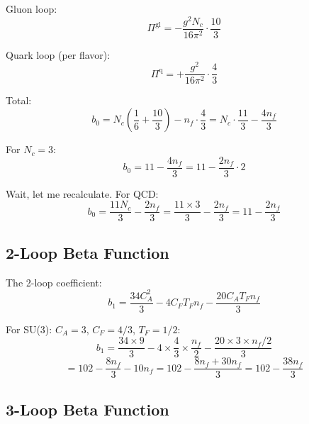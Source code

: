 \documentclass[11pt,a4paper]{article}
\theoremstyle{definition}
\begin{document}
Gluon loop:
\begin{equation}
\label{eq:gluon-contrib}
\Pi^{\text{gl}} = -\frac{g^2 N_c}{16\pi^2} \cdot \frac{10}{3}
\end{equation}

Quark loop (per flavor):
\begin{equation}
\label{eq:quark-contrib}
\Pi^{\text{q}} = +\frac{g^2}{16\pi^2} \cdot \frac{4}{3}
\end{equation}

Total:
\begin{equation}
\label{eq:total-beta-deriv}
b_0 = N_c\left(\frac{1}{6} + \frac{10}{3}\right) - n_f \cdot \frac{4}{3}
  = N_c \cdot \frac{11}{3} - \frac{4n_f}{3}
\end{equation}

For $N_c = 3$:
\begin{equation}
\label{eq:b0-nc3}
b_0 = 11 - \frac{4n_f}{3} = 11 - \frac{2n_f}{3} \cdot 2
\end{equation}

Wait, let me recalculate. For QCD:
\begin{equation}
\label{eq:b0-correct}
b_0 = \frac{11N_c}{3} - \frac{2n_f}{3} = \frac{11 \times 3}{3} - \frac{2n_f}{3} = 11 - \frac{2n_f}{3}
\end{equation}

\subsection{2-Loop Beta Function}
\label{subsec:2loop-beta-deriv}

The 2-loop coefficient:
\begin{equation}
\label{eq:b1-formula-app}
b_1 = \frac{34C_A^2}{3} - 4C_F T_F n_f - \frac{20C_A T_F n_f}{3}
\end{equation}

For SU(3): $C_A = 3$, $C_F = 4/3$, $T_F = 1/2$:
\begin{equation}
\label{eq:b1-su3-calc}
b_1 = \frac{34 \times 9}{3} - 4 \times \frac{4}{3} \times \frac{n_f}{2} - \frac{20 \times 3 \times n_f/2}{3}
\end{equation}
\begin{equation}
\label{eq:b1-su3-result}
= 102 - \frac{8n_f}{3} - 10n_f = 102 - \frac{8n_f + 30n_f}{3} = 102 - \frac{38n_f}{3}
\end{equation}

\subsection{3-Loop Beta Function}
\label{subsec:3loop-beta}
\end{document}
